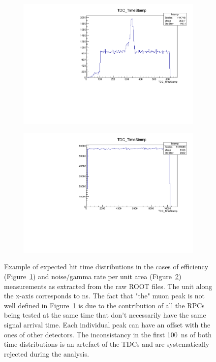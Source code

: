 	\begin{figure}[H]
        \begin{subfigure}{0.5\linewidth}
		    \centering
			\includegraphics[width = \linewidth]{fig/app2/beam_TS.pdf}
			\caption{\label{fig:TS:A}}
		\end{subfigure}
		\begin{subfigure}{0.5\linewidth}
		    \centering
			\includegraphics[width = \linewidth]{fig/app2/random_TS.pdf}
			\caption{\label{fig:TS:B}}
		\end{subfigure}
		\caption{\label{fig:TS} Example of expected hit time distributions in the cases of efficiency (Figure~\ref{fig:TS:A}) and noise/gamma rate per unit area (Figure~\ref{fig:TS:B}) measurements as extracted from the raw ROOT files. The unit along the x-axis corresponds to \si{ns}. The fact that "the" muon peak is not well defined in Figure~\ref{fig:TS:A} is due to the contribution of all the RPCs being tested at the same time that don't necessarily have the same signal arrival time. Each individual peak can have an offset with the ones of other detectors. The inconsistancy in the first \SI{100}{ns} of both time distributions is an artefact of the TDCs and are systematically rejected during the analysis.}
	\end{figure}
	
